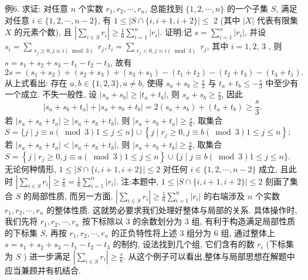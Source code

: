例6. 求证: 对任意 $n$ 个实数 $r_1, r_2, \cdots, r_n$, 总能找到 $\{1,2, \cdots, n\}$ 的一个子集 $S$, 满足对任意 $i \in\{1,2, \cdots, n-2\}$, 有 $1 \leqslant|S \cap\{i, i+1, i+2\}| \leqslant$ 2 (其中 $|X|$ 代表有限集 $X$ 的元素个数), 且 $\left|\sum_{i \in S} r_i\right| \geqslant \frac{1}{6} \sum_{i=1}^n\left|r_i\right|$.
证明:记 $s=\sum_{i=1}^n\left|r_i\right|$, 并设 $s_i=\sum_{\substack{r_j \geqslant 0, j \equiv i(\bmod 3)}} r_j, t_i=\sum_{\substack{r_j<0, j \equiv i(\bmod 3)}} r_j$, 其中 $i=1,2$, 3 , 则 $s=s_1+s_2+s_3-t_1-t_2-t_3$, 故有
$$
2 s=\left(s_1+s_2\right)+\left(s_2+s_3\right)+\left(s_3+s_1\right)-\left(t_1+t_2\right)-\left(t_2+t_3\right)-\left(t_3+t_1\right) .
$$
从上式看出: 存在 $a, b \in\{1,2,3\}, a \neq b$, 使得 $s_a+s_b \geqslant \frac{s}{3}$ 与 $t_a+t_b \leqslant-\frac{s}{3}$ 中至少有一个成立.
不失一般性, 设 $\left|s_a+s_b\right| \geqslant\left|t_a+t_b\right|$, 则 $s_a+s_b \geqslant \frac{s}{3}$, 因此
$$
\left|s_a+s_b+t_a\right|+\left|s_a+s_b+t_b\right|=2\left(s_a+s_b\right)+\left(t_a+t_b\right) \geqslant \frac{s}{3} .
$$
若 $\left|s_a+s_b+t_a\right| \geqslant\left|s_a+s_b+t_b\right|$, 则 $\left|s_a+s_b+t_a\right| \geqslant \frac{s}{6}$, 取集合 $S=\{j \mid j \equiv a(\bmod 3) 1 \leqslant j \leqslant n\} \cup\left\{j \mid r_j \geqslant 0, j \equiv b(\bmod 3) 1 \leqslant j \leqslant n\right\} ;$ 若 $\left|s_a+s_b+t_a\right|<\left|s_a+s_b+t_b\right|$, 则 $\left|s_a+s_b+t_b\right| \geqslant \frac{s}{6}$, 取集合 $S=\left\{j \mid r_j \geqslant 0, j \equiv a(\bmod 3) 1 \leqslant j \leqslant n\right\} \cup\{j \mid j \equiv b(\bmod 3) 1 \leqslant j \leqslant n\}$. 无论何种情形, $1 \leqslant|S \cap\{i, i+1, i+2\}| \leqslant 2$ 对任何 $i \in\{1,2, \cdots, n-2\}$ 成立, 且此时 $\left|\sum_{i \in S} r_i\right| \geqslant \frac{s}{6}=\frac{1}{6} \sum_{i=1}^n\left|r_i\right|$.
注:本题中, $1 \leqslant|S \cap\{i, i+1, i+2\}| \leqslant 2$ 刻画了集合 $S$ 的局部性质, 而另一方面, $\left|\sum_{i \in S} r_i\right| \geqslant \frac{1}{6} \sum_{i=1}^n\left|r_i\right|$ 的右端涉及 $n$ 个实数 $r_1, r_2, \cdots, r_n$ 的整体性质.
这就势必要求我们处理好整体与局部的关系.
具体操作时, 我们先将 $r_1, r_2, \cdots, r_n$ 按下标除以 3 的余数划分为 3 组, 有利于构造满足局部性质的下标集 $S$, 再按 $r_1, r_2, \cdots, r_n$ 的正负特性将上述 3 组分为 6 组, 通过整体上 $s=s_1+s_2+s_3-t_1-t_2-t_3$ 的制约, 设法找到几个组, 它们含有的数 $r_i$ (下标集为 $S$ ) 进一步满足 $\left|\sum_{i \in S} r_i\right| \geqslant \frac{s}{6}$.
从这个例子可以看出,整体与局部思想在解题中应当兼顾并有机结合.


